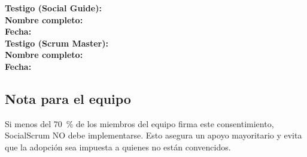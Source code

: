 \noindent
\textbf{Testigo (Social Guide):} \underline{\hspace{6cm}} \\[0.5cm]
\textbf{Nombre completo:} \underline{\hspace{6cm}} \\[0.5cm]
\textbf{Fecha:} \underline{\hspace{4cm}} \\[1cm]

\noindent
\textbf{Testigo (Scrum Master):} \underline{\hspace{6cm}} \\[0.5cm]
\textbf{Nombre completo:} \underline{\hspace{6cm}} \\[0.5cm]
\textbf{Fecha:} \underline{\hspace{4cm}} \\[1cm]

\vspace{1cm}

\subsection{Nota para el equipo}

Si menos del 70~\% de los miembros del equipo firma este consentimiento, SocialScrum NO debe implementarse. Esto asegura un apoyo mayoritario y evita que la adopción sea impuesta a quienes no están convencidos.